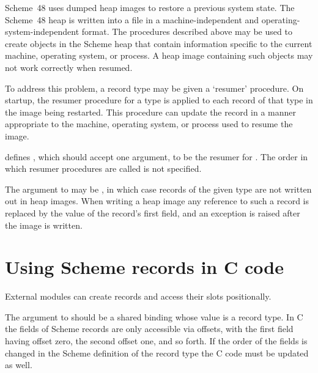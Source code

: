 Scheme~48 uses dumped heap images to restore a previous system state.
The Scheme~48 heap is written into a file in a machine-independent and
 operating-system-independent format.
The procedures described above may be used to create objects in the
 Scheme heap that contain information specific to the current
 machine, operating system, or process.
A heap image containing such objects may not work correctly
 when resumed.

To address this problem, a record type may be given a `resumer'
 procedure.
On startup, the resumer procedure for a type is applied to each record of
 that type in the image being restarted.
This procedure can update the record in a manner appropriate to
 the machine, operating system, or process used to resume the
 image.

\begin{protos}
\end{protos}

\noindent{} defines ,
 which should accept one argument, to be the resumer for
 .
The order in which resumer procedures are called is not specified.

The  argument to  may
 be , in which case records of the given type are
 not written out in heap images.
When writing a heap image any reference to such a record is replaced by
 the value of the record's first field, and an exception is raised
 after the image is written.

\section{Using Scheme records in C code}

External modules can create records and access their slots
 positionally.

\begin{protos}
\end{protos}
%
The argument to  should be a shared binding
 whose value is a record type.
In C the fields of Scheme records are only accessible via offsets,
 with the first field having offset zero, the second offset one, and
 so forth.
If the order of the fields is changed in the Scheme definition of the
 record type the C code must be updated as well.

